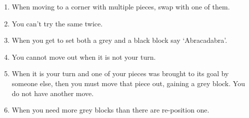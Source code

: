     \begin{enumerate}
        \item When moving to a corner with multiple pieces, swap with one of them.
        \item You can't try the same twice.
        \item When you get to set both a grey and a black block say `Abracadabra'.
        \item You cannot move out when it is not your turn.
        \item When it is your turn and one of your pieces was brought to its goal by someone else, then you must move that piece out, gaining a grey block. You do not have another move.
        \item When you need more grey blocks than there are re-position one.
    \end{enumerate}

\hrulefill






